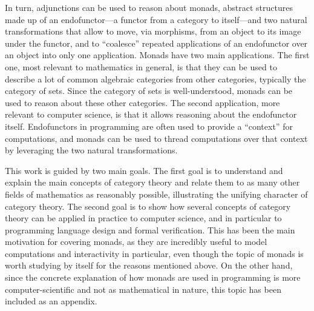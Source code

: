 In turn, adjunctions can be used to reason about monads, abstract structures
made up of an endofunctor---a functor from a category to itself---and two
natural transformations that allow to move, via morphisms, from an object to its
image under the functor, and to ``coalesce'' repeated applications of an
endofunctor over an object into only one application. Monads have two main
applications. The first one, most relevant to mathematics in general, is that
they can be used to describe a lot of common algebraic categories from other
categories, typically the category of sets. Since the category of sets is
well-understood, monads can be used to reason about these other categories. The
second application, more relevant to computer science, is that it allows
reasoning about the endofunctor itself. Endofunctors in programming are often
used to provide a ``context'' for computations, and monads can be used to thread
computations over that context by leveraging the two natural transformations.

This work is guided by two main goals. The first goal is to understand and
explain the main concepts of category theory and relate them to as many other
fields of mathematics as reasonably possible, illustrating the unifying
character of category theory. The second goal is to show how several concepts of
category theory can be applied in practice to computer science, and in
particular to programming language design and formal verification. This has been
the main motivation for covering monads, as they are incredibly useful to model
computations and interactivity in particular, even though the topic of monads is
worth studying by itself for the reasons mentioned above. On the other hand,
since the concrete explanation of how monads are used in programming is more
computer-scientific and not as mathematical in nature, this topic has been
included as an appendix.


